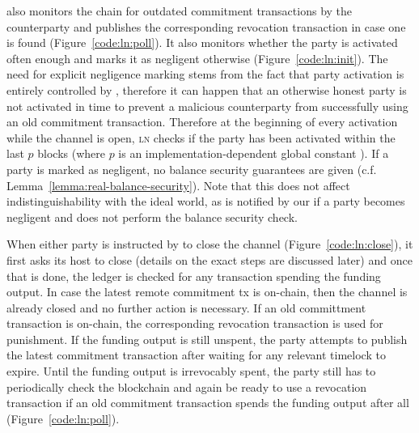   \pchan also monitors the chain for outdated commitment transactions by the
  counterparty and publishes the corresponding revocation transaction in case
  one is found (Figure~\ref{code:ln:poll}). It also monitors whether the party
  is activated often enough and marks it as negligent otherwise
  (Figure~\ref{code:ln:init}). The need for explicit negligence marking stems
  from the fact that party activation is entirely controlled by \environment,
  therefore it can happen that an otherwise honest party is not activated in
  time to prevent a malicious counterparty from successfully using an old
  commitment transaction. Therefore at the beginning of every activation while
  the channel is open, \textsc{ln} checks if the party has been activated within
  the last $p$ blocks (where $p$ is an implementation-dependent global constant
  ). If a party is marked as
  negligent, no balance security guarantees are given (c.f.
  Lemma~\ref{lemma:real-balance-security}). Note that this does not affect
  indistinguishability with the ideal world, as \fchan is notified by our
  \simulator if a party becomes negligent and does not perform the balance
  security check.

  When either party is instructed by \environment to close the channel
  (Figure~\ref{code:ln:close}), it first asks its host to close (details on the
  exact steps are discussed later) and once that is done, the ledger is checked
  for any transaction spending the funding output. In case the latest remote
  commitment tx is on-chain, then the channel is already closed and no further
  action is necessary. If an old committment transaction is on-chain, the
  corresponding revocation transaction is used for punishment. If the funding
  output is still unspent, the party attempts to publish the latest commitment
  transaction after waiting for any relevant timelock to expire. Until the
  funding output is irrevocably spent, the party still has to periodically check
  the blockchain and again be ready to use a revocation transaction if an old
  commitment transaction spends the funding output after all
  (Figure~\ref{code:ln:poll}).


